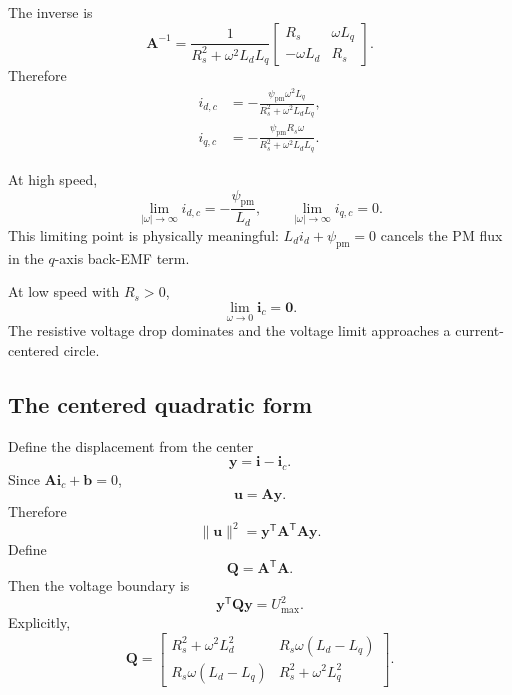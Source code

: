 \documentclass[11pt,a4paper]{article}
\newcommand{\id}{i_d}
\newcommand{\Rs}{R_s}
\newcommand{\Ld}{L_d}
\newcommand{\Lq}{L_q}
\newcommand{\psipm}{\psi_{\mathrm{pm}}}
\newcommand{\w}{\omega}
\newcommand{\Umax}{U_{\max}}
\newcommand{\T}{\mathsf{T}}
\newcommand{\vct}[1]{\bm{#1}}
\newcommand{\mat}[1]{\bm{#1}}
\begin{document}
The inverse is
\begin{equation}
  \mat A^{-1}
  =\frac{1}{\Rs^2+\w^2\Ld\Lq}
  \begin{bmatrix}
    \Rs&\w\Lq\\
    -\w\Ld&\Rs
  \end{bmatrix}.
\end{equation}
Therefore
\begin{align}
  i_{d,c}
  &= -\frac{\psipm\w^2\Lq}{\Rs^2+\w^2\Ld\Lq},
  \label{eq:psm-center-d}\\
  i_{q,c}
  &= -\frac{\psipm\Rs\w}{\Rs^2+\w^2\Ld\Lq}.
  \label{eq:psm-center-q}
\end{align}

At high speed,
\begin{equation}
  \lim_{|\w|\to\infty}i_{d,c}
  =-\frac{\psipm}{\Ld},
  \qquad
  \lim_{|\w|\to\infty}i_{q,c}=0.
  \label{eq:center-high-speed}
\end{equation}
This limiting point is physically meaningful: $\Ld\id+\psipm=0$ cancels the PM flux in the $q$-axis back-EMF term.

At low speed with $\Rs>0$,
\begin{equation}
  \lim_{\w\to0}\vct i_c=\vct 0.
\end{equation}
The resistive voltage drop dominates and the voltage limit approaches a current-centered circle.

\subsection{The centered quadratic form}

Define the displacement from the center
\begin{equation}
  \vct y=\vct i-\vct i_c.
\end{equation}
Since $\mat A\vct i_c+\vct b=0$,
\begin{equation}
  \vct u=\mat A\vct y.
\end{equation}
Therefore
\begin{equation}
  \|\vct u\|^2
  =\vct y^\T\mat A^\T\mat A\vct y.
\end{equation}
Define
\begin{equation}
  \mat Q=\mat A^\T\mat A.
\end{equation}
Then the voltage boundary is
\begin{equation}
  \boxed{\vct y^\T\mat Q\vct y=\Umax^2.}
  \label{eq:psm-ellipse-q}
\end{equation}
Explicitly,
\begin{equation}
  \mat Q=
  \begin{bmatrix}
  \Rs^2+\w^2\Ld^2 & \Rs\w(\Ld-\Lq)\\
  \Rs\w(\Ld-\Lq) & \Rs^2+\w^2\Lq^2
  \end{bmatrix}.
  \label{eq:psm-Q}
\end{equation}
\end{document}

